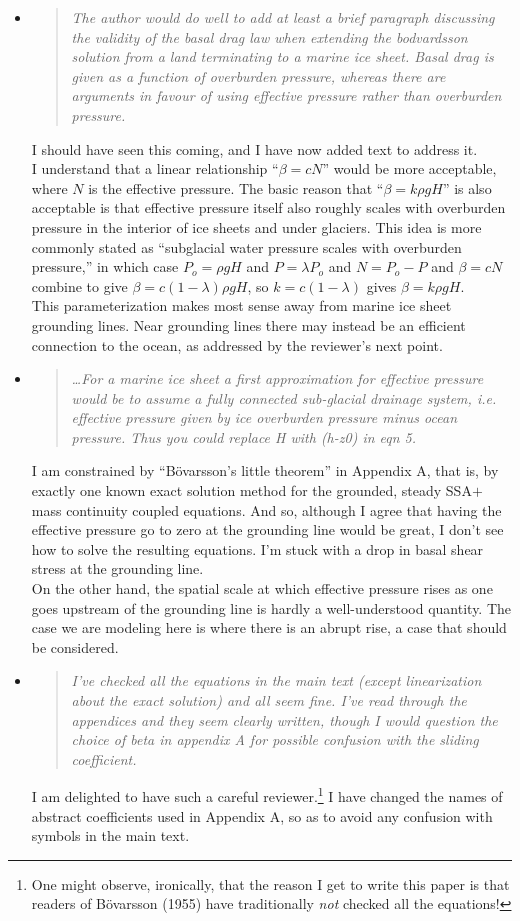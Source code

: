 \documentclass[11pt,reqno]{amsart}
\renewcommand{\dh}{\fontencoding{T1}\selectfont{\symbol{240}}}
\newcommand{\bod}{B\"o\dh varsson\xspace}
\newcommand{\citebod}{B\"o\dh varsson (1955)\xspace}
\newcommand{\reply}[2]{
\medskip\medskip
\item  \begin{quote}
\emph{#1}
\end{quote}

\medskip
\noindent #2}
\begin{document}
\begin{itemize}
\reply{The author would do well to add at least a brief paragraph discussing the validity of the basal drag law when extending the bodvardsson solution from a land terminating to a marine ice sheet.  Basal drag is given as a function of overburden pressure, whereas there are arguments in favour of using effective pressure rather than overburden pressure.}
{I should have seen this coming, and I have now added text to address it. \medskip \\
I understand that a linear relationship ``$\beta = c N$'' would be more acceptable, where $N$ is the effective pressure.  The basic reason that ``$\beta = k \rho g H$'' is also acceptable is that effective pressure itself also roughly scales with overburden pressure in the interior of ice sheets and under glaciers.  This idea is more commonly stated as ``subglacial water pressure scales with overburden pressure,'' in which case $P_o = \rho g H$ and $P=\lambda P_o$ and $N=P_o - P$ and $\beta = c N$ combine to give $\beta = c (1 - \lambda) \rho g H$, so $k=c(1-\lambda)$ gives $\beta = k \rho g H$.
\medskip \\
This parameterization makes most sense away from marine ice sheet grounding lines.  Near grounding lines there may instead be an efficient connection to the ocean, as addressed by the reviewer's next point.}

\reply{\dots For a marine ice sheet a first approximation for effective pressure would be to assume a fully connected sub-glacial drainage system, i.e. effective pressure given by ice overburden pressure minus ocean pressure. Thus you could replace H with (h-z0) in eqn 5.}
{I am constrained by ``\bod's little theorem'' in Appendix A, that is, by exactly one known exact solution method for the grounded, steady SSA$+$mass continuity coupled equations.  And so, although I agree that having the effective pressure go to zero at the grounding line would be great, I don't see how to solve the resulting equations.  I'm stuck with a drop in basal shear stress at the grounding line. \medskip \\
On the other hand, the spatial scale at which effective pressure rises as one goes upstream of the grounding line is hardly a well-understood quantity.  The case we are modeling here is where there is an abrupt rise, a case that should be considered.}

\reply{I've checked all the equations in the main text (except linearization about the exact solution) and all seem fine. I've read through the appendices and they seem clearly written, though I would question the choice of beta in appendix A for possible confusion with the sliding coefficient.}
{I am delighted to have such a careful reviewer.\footnote{One might observe, ironically, that the reason I get to write this paper is that readers of \citebod have traditionally \emph{not} checked all the equations!}  I have changed the names of abstract coefficients used in Appendix A, so as to avoid any confusion with symbols in the main text.}


\end{itemize}
\end{document}
